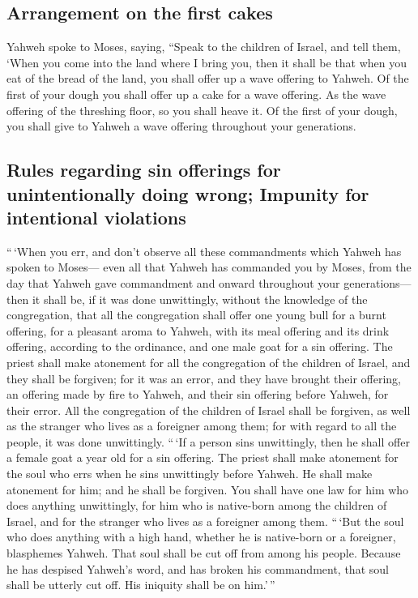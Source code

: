 \hypertarget{arrangement-on-the-first-cakes}{%
\subsection{Arrangement on the first
cakes}\label{arrangement-on-the-first-cakes}}

 Yahweh spoke to Moses, saying,  ``Speak
to the children of Israel, and tell them, `When you come into the land
where I bring you,  then it shall be that when you eat of
the bread of the land, you shall offer up a wave offering to Yahweh.
 Of the first of your dough you shall offer up a cake for
a wave offering. As the wave offering of the threshing floor, so you
shall heave it.  Of the first of your dough, you shall
give to Yahweh a wave offering throughout your generations.

\hypertarget{rules-regarding-sin-offerings-for-unintentionally-doing-wrong-impunity-for-intentional-violations}{%
\subsection{Rules regarding sin offerings for unintentionally doing
wrong; Impunity for intentional
violations}\label{rules-regarding-sin-offerings-for-unintentionally-doing-wrong-impunity-for-intentional-violations}}

 ``\,`When you err, and don't observe all these
commandments which Yahweh has spoken to Moses---  even
all that Yahweh has commanded you by Moses, from the day that Yahweh
gave commandment and onward throughout your generations---
 then it shall be, if it was done unwittingly, without
the knowledge of the congregation, that all the congregation shall offer
one young bull for a burnt offering, for a pleasant aroma to Yahweh,
with its meal offering and its drink offering, according to the
ordinance, and one male goat for a sin offering.  The
priest shall make atonement for all the congregation of the children of
Israel, and they shall be forgiven; for it was an error, and they have
brought their offering, an offering made by fire to Yahweh, and their
sin offering before Yahweh, for their error.  All the
congregation of the children of Israel shall be forgiven, as well as the
stranger who lives as a foreigner among them; for with regard to all the
people, it was done unwittingly.  ``\,`If a person sins
unwittingly, then he shall offer a female goat a year old for a sin
offering.  The priest shall make atonement for the soul
who errs when he sins unwittingly before Yahweh. He shall make atonement
for him; and he shall be forgiven.  You shall have one
law for him who does anything unwittingly, for him who is native-born
among the children of Israel, and for the stranger who lives as a
foreigner among them.  ``\,`But the soul who does
anything with a high hand, whether he is native-born or a foreigner,
blasphemes Yahweh. That soul shall be cut off from among his people.
 Because he has despised Yahweh's word, and has broken
his commandment, that soul shall be utterly cut off. His iniquity shall
be on him.'\,''

